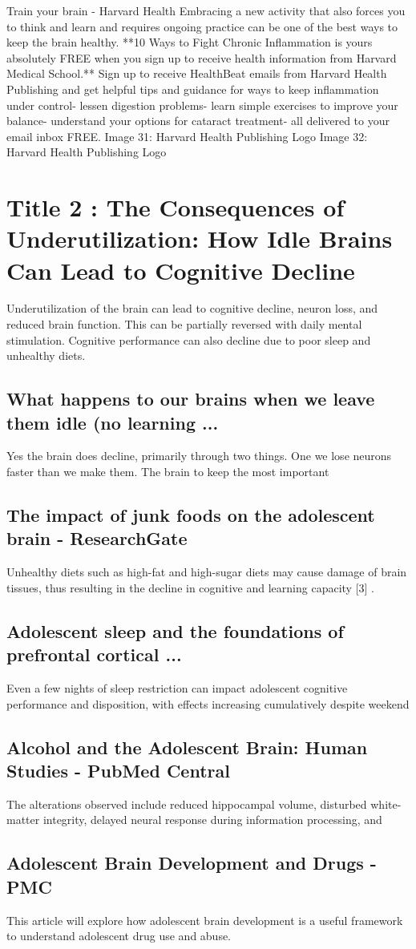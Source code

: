 \documentclass[12pt]{article}
\begin{document}
Train your brain - Harvard Health Embracing a new activity that also forces you to think and learn and requires ongoing practice can be one of the best ways to keep the brain healthy. **10 Ways to Fight Chronic Inflammation is yours absolutely FREE when you sign up to receive health information from Harvard Medical School.** Sign up to receive HealthBeat emails from Harvard Health Publishing and get helpful tips and guidance for ways to keep inflammation under control- lessen digestion problems- learn simple exercises to improve your balance- understand your options for cataract treatment- all delivered to your email inbox FREE. Image 31: Harvard Health Publishing Logo Image 32: Harvard Health Publishing Logo
\section{Title 2 : The Consequences of Underutilization: How Idle Brains Can Lead to Cognitive Decline}
Underutilization of the brain can lead to cognitive decline, neuron loss, and reduced brain function. This can be partially reversed with daily mental stimulation. Cognitive performance can also decline due to poor sleep and unhealthy diets.\subsection{What happens to our brains when we leave them idle (no learning ...}
Yes the brain does decline, primarily through two things. One we lose neurons faster than we make them. The brain to keep the most important\subsection{The impact of junk foods on the adolescent brain - ResearchGate}
Unhealthy diets such as high-fat and high-sugar diets may cause damage of brain tissues, thus resulting in the decline in cognitive and learning capacity [3] .\subsection{Adolescent sleep and the foundations of prefrontal cortical ...}
Even a few nights of sleep restriction can impact adolescent cognitive performance and disposition, with effects increasing cumulatively despite weekend\subsection{Alcohol and the Adolescent Brain: Human Studies - PubMed Central}
The alterations observed include reduced hippocampal volume, disturbed white-matter integrity, delayed neural response during information processing, and\subsection{Adolescent Brain Development and Drugs - PMC}
This article will explore how adolescent brain development is a useful framework to understand adolescent drug use and abuse.
\end{document}
